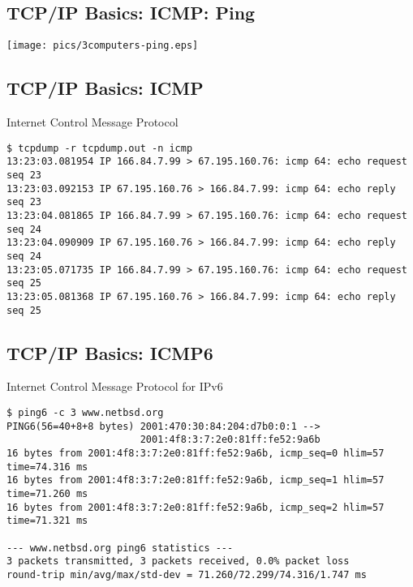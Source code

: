 \documentclass[xga]{xdvislides}
\begin{document}
\subsection{TCP/IP Basics: ICMP: Ping}
\vspace*{\fill}
\begin{center}
	\texttt{[image: pics/3computers-ping.eps]}
\end{center}
\vspace*{\fill}


\subsection{TCP/IP Basics: ICMP}
\begin{center}
Internet Control Message Protocol
\end{center}
\vspace{.2in}

\begin{verbatim}
$ tcpdump -r tcpdump.out -n icmp
13:23:03.081954 IP 166.84.7.99 > 67.195.160.76: icmp 64: echo request seq 23
13:23:03.092153 IP 67.195.160.76 > 166.84.7.99: icmp 64: echo reply seq 23
13:23:04.081865 IP 166.84.7.99 > 67.195.160.76: icmp 64: echo request seq 24
13:23:04.090909 IP 67.195.160.76 > 166.84.7.99: icmp 64: echo reply seq 24
13:23:05.071735 IP 166.84.7.99 > 67.195.160.76: icmp 64: echo request seq 25
13:23:05.081368 IP 67.195.160.76 > 166.84.7.99: icmp 64: echo reply seq 25
\end{verbatim}


\subsection{TCP/IP Basics: ICMP6}
\begin{center}
Internet Control Message Protocol for IPv6
\end{center}
\vspace{.2in}

\begin{verbatim}
$ ping6 -c 3 www.netbsd.org
PING6(56=40+8+8 bytes) 2001:470:30:84:204:d7b0:0:1 -->
                       2001:4f8:3:7:2e0:81ff:fe52:9a6b
16 bytes from 2001:4f8:3:7:2e0:81ff:fe52:9a6b, icmp_seq=0 hlim=57 time=74.316 ms
16 bytes from 2001:4f8:3:7:2e0:81ff:fe52:9a6b, icmp_seq=1 hlim=57 time=71.260 ms
16 bytes from 2001:4f8:3:7:2e0:81ff:fe52:9a6b, icmp_seq=2 hlim=57 time=71.321 ms

--- www.netbsd.org ping6 statistics ---
3 packets transmitted, 3 packets received, 0.0% packet loss
round-trip min/avg/max/std-dev = 71.260/72.299/74.316/1.747 ms
\end{verbatim}
\end{document}
